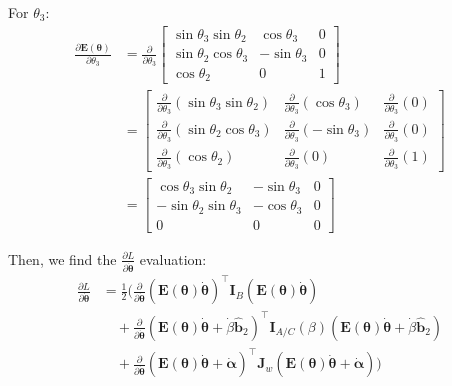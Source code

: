 \documentclass[titlepage]{article}
\begin{document}
For $\theta_3$:
\begin{equation}
	\begin{split}
		\frac{\partial\boldsymbol{E}(\boldsymbol{\theta})}{\partial\theta_3}&=\frac{\partial}{\partial\theta_3}
		\begin{bmatrix}
			\sin\theta_3\sin\theta_2 & \cos\theta_3 & 0 \\
			\sin\theta_2\cos\theta_3 & -\sin\theta_3 & 0 \\
			\cos\theta_2 & 0 & 1
		\end{bmatrix} \\
		&=
		\begin{bmatrix}
			\frac{\partial}{\partial\theta_3}\left(\sin\theta_3\sin\theta_2\right) & \frac{\partial}{\partial\theta_3}\left(\cos\theta_3\right) & \frac{\partial}{\partial\theta_3}\left(0\right) \\
			\frac{\partial}{\partial\theta_3}\left(\sin\theta_2\cos\theta_3\right) & \frac{\partial}{\partial\theta_3}\left(-\sin\theta_3\right) & \frac{\partial}{\partial\theta_3}\left(0\right) \\
			\frac{\partial}{\partial\theta_3}\left(\cos\theta_2\right) & \frac{\partial}{\partial\theta_3}\left(0\right) & \frac{\partial}{\partial\theta_3}\left(1\right)
		\end{bmatrix} \\
		&=
		\begin{bmatrix}
			\cos\theta_3\sin\theta_2 & -\sin\theta_3 & 0 \\
			-\sin\theta_2\sin\theta_3 & -\cos\theta_3 & 0 \\
			0 & 0 & 0
		\end{bmatrix}
	\end{split}
\end{equation}

Then, we find the $\frac{\partial L}{\partial\dot{\boldsymbol{\theta}}}$ evaluation:
\begin{equation}
	\begin{split}
		\frac{\partial L}{\partial\dot{\boldsymbol{\theta}}}&=\frac{1}{2}\bigg(\frac{\partial}{\partial\dot{\boldsymbol{\theta}}}\left(\boldsymbol{E}(\boldsymbol{\theta})\dot{\boldsymbol{\theta}}\right)^\top\boldsymbol{I}_B\left(\boldsymbol{E}(\boldsymbol{\theta})\dot{\boldsymbol{\theta}}\right) \\
		&\quad+\frac{\partial}{\partial\dot{\boldsymbol{\theta}}}\left(\boldsymbol{E}(\boldsymbol{\theta})\dot{\boldsymbol{\theta}}+\dot{\beta}\hat{\boldsymbol{b}}_2\right)^\top\boldsymbol{I}_{A/C}(\beta)\left(\boldsymbol{E}(\boldsymbol{\theta})\dot{\boldsymbol{\theta}}+\dot{\beta}\hat{\boldsymbol{b}}_2\right) \\
		&\quad+\frac{\partial}{\partial\dot{\boldsymbol{\theta}}}\left(\boldsymbol{E}(\boldsymbol{\theta})\dot{\boldsymbol{\theta}}+\dot{\boldsymbol{\alpha}}\right)^\top\boldsymbol{J}_w\left(\boldsymbol{E}(\boldsymbol{\theta})\dot{\boldsymbol{\theta}}+\dot{\boldsymbol{\alpha}}\right)\bigg)
	\end{split}
	\label{eq:thetadotterm}
\end{equation}
\end{document}
